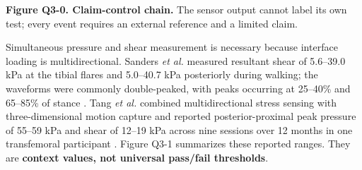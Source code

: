 \vspace{0.2em}
\begin{center}
\end{center}
{\fontsize{7.5}{8.7}\selectfont\color{AUBGray}
\textbf{Figure Q3-0. Claim-control chain.} The sensor output cannot label its
own test; every event requires an external reference and a limited claim.\par}

\vspace{0.55em}

\clearpage
{}

\hypertarget{q3-mechanical-evidence}{}

{\fontsize{9.55}{11.3}\selectfont
Simultaneous pressure and shear measurement is necessary because interface
loading is multidirectional. Sanders \textit{et al.} measured resultant shear
of 5.6--39.0 kPa at the tibial flares and 5.0--40.7 kPa posteriorly during
walking; the waveforms were commonly double-peaked, with peaks occurring at
25--40\% and 65--85\% of stance \cite{q3sanders1992}. Tang \textit{et al.}
combined multidirectional stress sensing with three-dimensional motion capture
and reported posterior-proximal peak pressure of 55--59 kPa and shear of
12--19 kPa across nine sessions over 12 months in one transfemoral participant
\cite{q3tang2022}. Figure Q3-1 summarizes these reported ranges. They are
\textbf{context values, not universal pass/fail thresholds}.\par}


